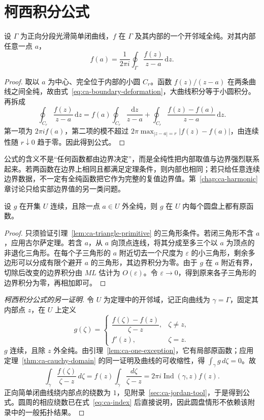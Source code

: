 \section{柯西积分公式}

\begin{theorem}[柯西积分公式]
\label{thm:ca-cauchy-formula}
设 $\Gamma$ 为正向分段光滑简单闭曲线，$f$ 在 $\Gamma$ 及其内部的一个开邻域全纯。对其内部任意一点 $a$，
\begin{equation}
 f(a)=\frac1{2\pi i}\oint_\Gamma\frac{f(z)}{z-a}\,\mathrm dz.
 \label{eq:ca-cauchy-formula}
\end{equation}
\end{theorem}
\begin{proof}
取以 $a$ 为中心、完全位于内部的小圆 $C_r$。函数 $f(z)/(z-a)$ 在两条曲线之间全纯，故由式~\eqref{eq:ca-boundary-deformation}，大曲线积分等于小圆积分。再拆成
\[
 \oint_{C_r}\frac{f(z)}{z-a}\,\mathrm dz
 =f(a)\oint_{C_r}\frac{\mathrm dz}{z-a}
 +\oint_{C_r}\frac{f(z)-f(a)}{z-a}\,\mathrm dz.
\]
第一项为 $2\pi i f(a)$，第二项的模不超过
$2\pi\max_{|z-a|=r}|f(z)-f(a)|$，由连续性随 $r\downarrow0$ 趋于零。因此得到公式。
\end{proof}

公式的含义不是“任何函数都由边界决定”，而是全纯性把内部取值与边界强烈联系起来。若两函数在边界上相同且都满足定理条件，则内部也相同；若只给任意连续边界数据，不一定有全纯函数把它作为完整的复值边界值。第~\ref{chap:ca-harmonic} 章讨论只给实部边界值的另一类问题。

\begin{lemma}
\label{lem:ca-one-exception}
设 $g$ 在开集 $U$ 连续，且除一点 $a\in U$ 外全纯，则 $g$ 在 $U$ 内每个圆盘上都有原函数。
\end{lemma}
\begin{proof}
只须验证引理~\ref{lem:ca-triangle-primitive} 的三角形条件。若闭三角形不含 $a$，应用古尔萨定理。若含 $a$，从 $a$ 向顶点连线，将其分成至多三个以 $a$ 为顶点的非退化三角形。在每个子三角形的 $a$ 附近切去一个尺度为 $\varepsilon$ 的小三角形，剩余多边形可以分成有限个避开 $a$ 的三角形，其边界积分为零。由于 $g$ 在 $a$ 附近有界，切除后改变的边界积分由 $ML$ 估计为 $O(\varepsilon)$。令 $\varepsilon\to0$，得到原来各子三角形的边界积分为零，再相加即可。
\end{proof}

\begin{proof}[柯西积分公式的另一证明]
令 $U$ 为定理中的开邻域，记正向曲线为 $\gamma=\Gamma$，固定其内部点 $z$，在 $U$ 上定义
\[
 g(\zeta)=\begin{cases}
 \dfrac{f(\zeta)-f(z)}{\zeta-z},&\zeta\ne z,\\
 f'(z),&\zeta=z.
 \end{cases}
\]
$g$ 连续，且除 $z$ 外全纯。由引理~\ref{lem:ca-one-exception}，它有局部原函数；应用定理~\ref{thm:ca-cauchy-domain} 的同一证明及曲线的可收缩性，得 $\int_\gamma g\,d\zeta=0$。故
\[
 \int_\gamma\frac{f(\zeta)}{\zeta-z}\,d\zeta
 =f(z)\int_\gamma\frac{d\zeta}{\zeta-z}
 =2\pi i\operatorname{Ind}(\gamma,z)f(z).
\]
正向简单闭曲线绕内部点的绕数为 $1$，见附录~\ref{sec:ca-jordan-tool}，于是得到公式。圆周的相应绕数已在式~\eqref{eq:ca-index} 后直接说明，因此圆盘情形不依赖该附录中的一般拓扑结果。
\end{proof}

